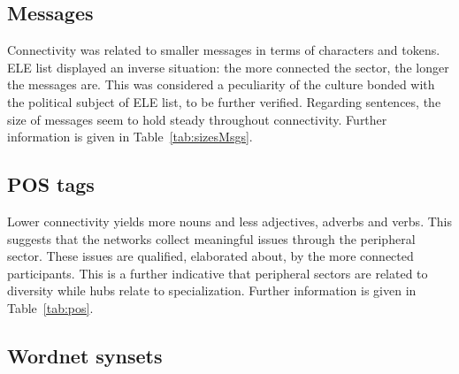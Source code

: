 \subsection{Messages}\label{subsec:mm}

Connectivity was related to smaller messages in terms of characters and tokens.
ELE list displayed an inverse situation:
the more connected the sector,
the longer the messages are.
This was considered a peculiarity of the culture bonded
with the political subject of ELE list, to be further verified.
Regarding sentences,
the size of messages seem to hold steady throughout connectivity.
Further information is given in Table~\ref{tab:sizesMsgs}.

\subsection{POS tags}\label{subsec:pos}

Lower connectivity yields more nouns and less adjectives,
adverbs and verbs.
This suggests that the networks collect meaningful issues
through the peripheral sector. 
These issues are qualified, elaborated about,
by the more connected participants.
This is a further indicative that peripheral sectors
are related to diversity while hubs relate to specialization.
Further information is given in Table~\ref{tab:pos}.

\subsection{Wordnet synsets}\label{subsec:pos}

%
%
%
%
%
%
%
%
%
%
%
%
%





